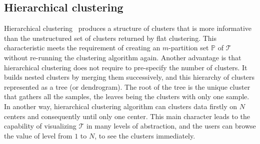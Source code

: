 \subsection{Hierarchical clustering}%
\label{subsec:hierarchical}
Hierarchical clustering~\cite{johnson1967hierarchical} produces a structure of clusters that is more informative than the unstructured set of clusters returned by flat clustering. This characteristic meets the requirement of creating an $m$-partition set $\mathbb{P}$ of $\mathcal{T}$ 
without re-running the clustering algorithm again. Another advantage is that hierarchical clustering does not require to pre-specify the number of clusters. It builds nested clusters by merging them successively, and this hierarchy of clusters represented as a tree (or dendrogram). The root of the tree is the unique cluster that gathers all the samples, the leaves being the clusters with only one sample. In another way, hierarchical clustering algorithm
can clusters data firstly on $N$ centers and consequently until only one center. This main character leads to the capability of visualizing $\mathcal{T}$ in many levels of abstraction, and the users can browse the value of level from $1$ to $N$, to see the clusters immediately.

